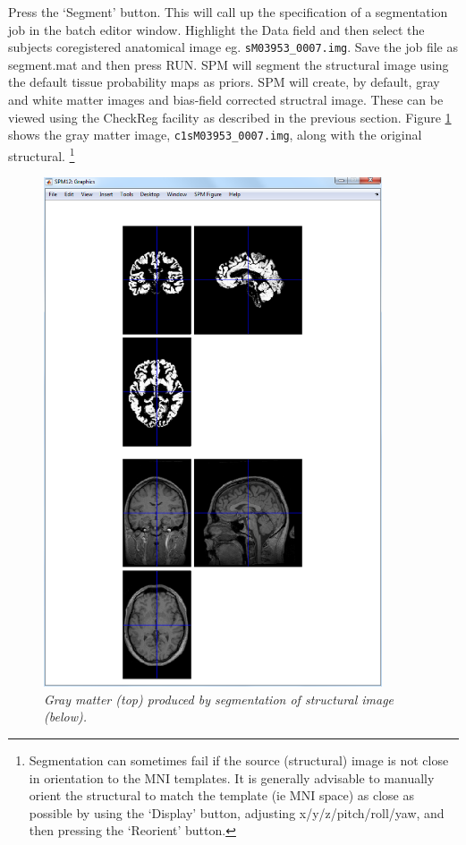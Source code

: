 Press the `Segment' button. This will call up the specification of a segmentation job in the batch editor 
window. Highlight the Data field and then select 
the subjects coregistered anatomical image 
eg. \verb!sM03953_0007.img!. Save the job file
as {\sf segment.mat} and then press RUN.
SPM will segment the structural image using 
the default tissue probability maps as 
priors. 
SPM will create, by default, gray and white matter
images and bias-field corrected structral image.
These can be viewed using the CheckReg facility 
as described in the previous section. Figure \ref{face_gray} shows the gray matter image, \verb!c1sM03953_0007.img!, along with the original structural. \footnote{Segmentation can sometimes fail if the source (structural) image is not close in orientation to the MNI templates. It is generally advisable to manually orient the structural to match the template (ie MNI space) as close as possible by using the `Display' button, adjusting x/y/z/pitch/roll/yaw, and then pressing the `Reorient' button.}

\begin{figure}
\begin{center}
\includegraphics[width=100mm]{faces/gray}
\caption{\em Gray matter (top) produced by segmentation of structural image (below). \label{face_gray}}
\end{center}
\end{figure}

